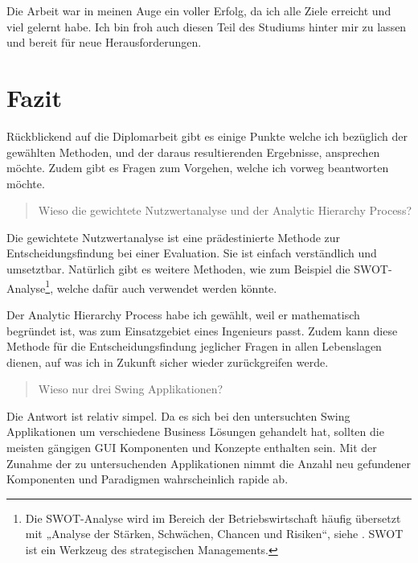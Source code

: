 Die Arbeit war in meinen Auge ein voller Erfolg, da ich alle Ziele erreicht und
viel gelernt habe. Ich bin froh auch diesen Teil des Studiums hinter mir zu
lassen und bereit für neue Herausforderungen.

\section{Fazit}

Rückblickend auf die Diplomarbeit gibt es einige Punkte welche ich bezüglich der
gewählten Methoden, und der daraus resultierenden Ergebnisse, ansprechen möchte.
Zudem gibt es Fragen zum Vorgehen, welche ich vorweg beantworten möchte.
\newline

\begin{quote}\begin{itshape}Wieso die gewichtete Nutzwertanalyse und der
Analytic Hierarchy Process?\end{itshape}\end{quote}

Die gewichtete Nutzwertanalyse ist eine prädestinierte Methode zur
Entscheidungsfindung bei einer Evaluation. Sie ist einfach verständlich und
umsetztbar. Natürlich gibt es weitere Methoden, wie zum Beispiel die
SWOT-Analyse\footnote{Die SWOT-Analyse wird im Bereich der Betriebswirtschaft
häufig übersetzt mit „Analyse der Stärken, Schwächen, Chancen und
Risiken“, siehe \cite{SWOT}. SWOT ist ein Werkzeug des strategischen
Managements.}, welche dafür auch verwendet werden könnte.

Der Analytic Hierarchy Process habe ich gewählt, weil er mathematisch begründet
ist, was zum Einsatzgebiet eines Ingenieurs passt. Zudem kann diese Methode für
die Entscheidungsfindung jeglicher Fragen in allen Lebenslagen dienen, auf
was ich in Zukunft sicher wieder zurückgreifen werde.
\newline

\begin{quote}\begin{itshape}Wieso nur drei Swing
Applikationen?\end{itshape}\end{quote}

Die Antwort ist relativ simpel. Da es sich bei den untersuchten Swing
Applikationen um verschiedene Business Lösungen gehandelt hat, sollten die
meisten gängigen GUI Komponenten und Konzepte enthalten sein. Mit der Zunahme
der zu untersuchenden Applikationen nimmt die Anzahl neu gefundener Komponenten
und Paradigmen wahrscheinlich rapide ab.
\newline


